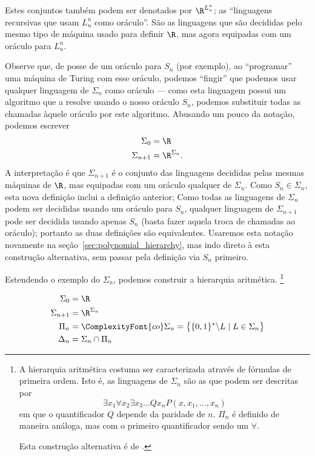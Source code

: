Estes conjuntos também podem ser denotados por $\R^{L_u^n}$;
as ``linguagens recursivas que usam $L_u^n$ como oráculo''.
São as linguagens que são decididas
pelo mesmo tipo de máquina usado para definir $\R$,
mas agora equipadas com um oráculo para $L_u^n$.

Observe que,
de posse de um oráculo para $S_n$ (por exemplo),
ao ``programar'' uma máquina de Turing com esse oráculo,
podemos ``fingir'' que podemos usar qualquer linguagem de $\Sigma_n$ como oráculo
--- como esta linguagem possui um algoritmo que a resolve
usando o nosso oráculo $S_n$,
podemos substituir todas as chamadas àquele oráculo
por este algoritmo.
Abusando um pouco da notação,
podemos escrever
\begin{equation}
    \begin{aligned}
        \Sigma_0 &= \R \\
        \Sigma_{n+1} &= \R^{\Sigma_n}.
    \end{aligned}
    \label{eq:oracle_notation_abuse}
\end{equation}
A interpretação é que $\Sigma_{n+1}$ é o conjunto das linguagens
decididas pelas mesmas máquinas de $\R$,
mas equipadas com um oráculo qualquer de $\Sigma_n$.
Como $S_n \in \Sigma_n$, esta nova definição inclui a definição anterior;
Como todas as linguagens de $\Sigma_n$ podem ser decididas usando um oráculo para $S_n$,
qualquer linguagem de $\Sigma_{n+1}$
pode ser decidida usando apenas $S_n$
(basta fazer aquela troca de chamadas ao oráculo);
portanto as duas definições são equivalentes.
Usaremos esta notação novamente na seção~\ref{sec:polynomial_hierarchy},
mas indo direto à esta construção alternativa,
sem passar pela definição via $S_n$ primeiro.

Estendendo o exemplo do $\Sigma_n$,
podemos construir a hierarquia aritmética.%
\footnote{
    A hierarquia aritmética costuma ser caracterizada
    através de fórmulas de primeira ordem.
    Isto é,
    as linguagens de $\Sigma_n$ são as que podem ser descritas por
    \begin{equation*}
        \exists x_1 \forall x_2 \exists x_3 \dots Q x_n P(x, x_1, \dots, x_n)
    \end{equation*}
    em que o quantificador $Q$ depende da paridade de $n$.
    $\Pi_n$ é definido de maneira análoga,
    mas com o primeiro quantificador sendo um $\forall$.

    Esta construção alternativa é de .
}
\begin{definition}
    \begin{align*}
        \Sigma_0 &= \R \\
        \Sigma_{n+1} &= \R^{\Sigma_n} \\
        \Pi_n &= \ComplexityFont{co}\Sigma_n =
            \big\{ \{0, 1\}^* \backslash L \mid L \in \Sigma_n \big\} \\
        \Delta_n &= \Sigma_n \cap \Pi_n \\
    \end{align*}
\end{definition}

